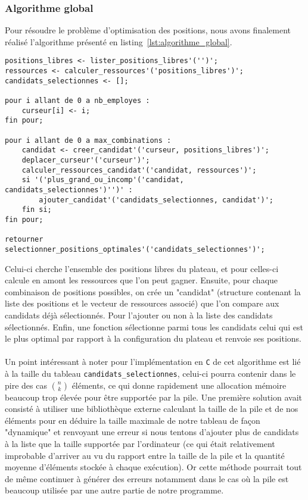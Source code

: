 \subsubsection{Algorithme global}
Pour résoudre le problème d'optimisation des positions, nous avons finalement réalisé l'algorithme présenté en listing~\ref{lst:algorithme_global}.\\
\begin{lstlisting}[style=customstyle]
positions_libres <- lister_positions_libres'('')';
ressources <- calculer_ressources'('positions_libres')';
candidats_selectionnes <- [];

pour i allant de 0 a nb_employes :
    curseur[i] <- i;
fin pour;

pour i allant de 0 a max_combinations :
    candidat <- creer_candidat'('curseur, positions_libres')';
    deplacer_curseur'('curseur')';
    calculer_ressources_candidat'('candidat, ressources')';
    si '('plus_grand_ou_incomp'('candidat, candidats_selectionnes')'')' :
        ajouter_candidat'('candidats_selectionnes, candidat')';
    fin si;
fin pour;

retourner selectionner_positions_optimales'('candidats_selectionnes')';
\end{lstlisting}
\label{lst:algorithme_global}
\vspace{0.5cm}
Celui-ci cherche l'ensemble des positions libres du plateau, et pour celles-ci calcule en amont les ressources que l'on peut gagner. Ensuite, pour chaque combinaison de positions possibles, on crée un "candidat" (structure contenant la liste des positions et le vecteur de ressources associé) que l'on compare aux candidats déjà sélectionnés. Pour l'ajouter ou non à la liste des candidats sélectionnés. Enfin, une fonction sélectionne parmi tous les candidats celui qui est le plus optimal par rapport à la configuration du plateau et renvoie ses positions.\\ \\
Un point intéressant à noter pour l'implémentation en \texttt{C} de cet algorithme est lié à la taille du tableau \texttt{candidats\_selectionnes}, celui-ci pourra contenir dans le pire des cas \(\binom{n}{k}\) éléments, ce qui donne rapidement une allocation mémoire beaucoup trop élevée pour être supportée par la pile. Une première solution avait consisté à utiliser une bibliothèque externe calculant la taille de la pile et de nos éléments pour en déduire la taille maximale de notre tableau de façon "dynamique" et renvoyant une erreur si nous tentons d'ajouter plus de candidats à la liste que la taille supportée par l'ordinateur (ce qui était relativement improbable d'arriver au vu du rapport entre la taille de la pile et la quantité moyenne d'éléments stockée à chaque exécution). Or cette méthode pourrait tout de même continuer à générer des erreurs notamment dans le cas où la pile est beaucoup utilisée par une autre partie de notre programme. \\ \\
